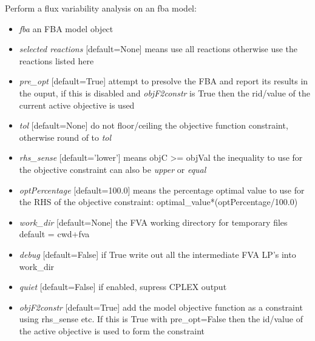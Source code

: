 \documentclass[a4paper,11pt,english]{sphinxmanual}
\begin{document}
\begin{fulllineitems}
\label{modules_doc:cbmpy.CBCPLEX.cplx_FluxVariabilityAnalysis}
Perform a flux variability analysis on an fba model:
\begin{itemize}
\item {} 
\emph{fba} an FBA model object

\item {} 
\emph{selected reactions} {[}default=None{]} means use all reactions otherwise use the reactions listed here

\item {} 
\emph{pre\_opt} {[}default=True{]} attempt to presolve the FBA and report its results in the ouput, if this is disabled and \emph{objF2constr} is True then the rid/value of the current active objective is used

\item {} 
\emph{tol}  {[}default=None{]} do not floor/ceiling the objective function constraint, otherwise round of to \emph{tol}

\item {} 
\emph{rhs\_sense} {[}default='lower'{]} means objC \textgreater{}= objVal the inequality to use for the objective constraint can also be \emph{upper} or \emph{equal}

\item {} 
\emph{optPercentage} {[}default=100.0{]} means the percentage optimal value to use for the RHS of the objective constraint: optimal\_value*(optPercentage/100.0)

\item {} 
\emph{work\_dir} {[}default=None{]} the FVA working directory for temporary files default = cwd+fva

\item {} 
\emph{debug} {[}default=False{]} if True write out all the intermediate FVA LP's into work\_dir

\item {} 
\emph{quiet} {[}default=False{]} if enabled, supress CPLEX output

\item {} 
\emph{objF2constr} {[}default=True{]} add the model objective function as a constraint using rhs\_sense etc. If
this is True with pre\_opt=False then the id/value of the active objective is used to form the constraint


\end{itemize}
\end{fulllineitems}
\end{document}
